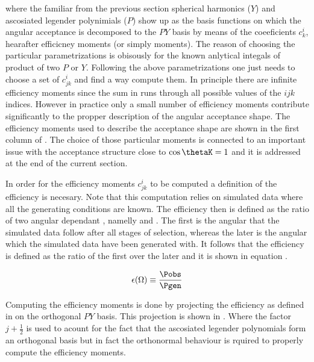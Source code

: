 \noindent where the familiar from the previous section spherical harmonics ($Y$) and ascosiated legender polynimials ($P$) show up as the basis
functions on which the angular acceptance is decomposed to the $PY$ basis by means of the coeeficients $c^i_{k}$, hearafter efficicney moments (or simply moments). 
The reason of choosing the particular parametrizations is obisously for the known anlytical integals of product of two $P$ or $Y$. 
Following the above parametrizations one just needs to choose a set of $c^i_{jk}$ and find a way compute them. In principle there are infinite efficiency moments
since the sum in  runs through all possible values of the $ijk$ indices. However in practice only a small number of efficiency moments 
contribute significantly to the propper description of the angular acceptance shape. The efficiency moments used to describe the acceptance 
shape are shown in the first column of . The choice of those particular moments is connected to an important issue with the acceptance 
structure close to $\cos\thetaK=1$ and it is addressed at the end of the current section.   

In order for the efficiency moments $c^i_{jk}$ to be computed a definition of the efficiency is necesary. Note that this computation relies on 
simulated data where all the generating conditions are known. The efficiency then is defined as the ratio of two angular dependant \pdfs, namelly
\Pobs and \Pgen. The first is the angular \pdf that the simulated data follow after all stages of selection, whereas
the later is the angular \pdf which the simulated data have been generated with. It follows that the efficiency is defined as the ratio of the first
over the later and it is shown in equation .

\begin{center}
\begin{equation}
  \epsilon(\Omega) \equiv \frac{\Pobs}{\Pgen}
  \label{eff_def}
\end{equation}
\end{center}

\noindent Computing the efficiency moments is done by projecting the efficiency as defined in  on the orthogonal $PY$ basis.
This projection is shown in . Where the factor $j+\frac{1}{2}$ is used to acount for the fact that the ascosiated legender 
polynomials form an orthogonal basis but in fact the orthonormal behaviour is rquired to properly compute the efficiency moments. 


